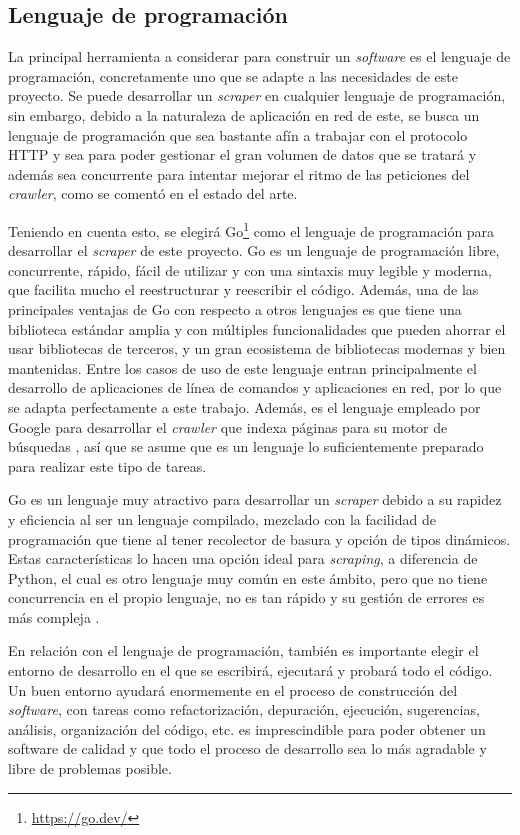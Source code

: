 \subsection{Lenguaje de programación}
La principal herramienta a considerar para construir un \textit{software} es el
lenguaje de programación, concretamente uno que se adapte a las necesidades de
este proyecto. Se puede desarrollar un \textit{scraper} en cualquier lenguaje de
programación, sin embargo, debido a la naturaleza de aplicación en red de este,
se busca un lenguaje de programación que sea bastante afín a trabajar con el
protocolo HTTP y sea para poder gestionar el gran volumen de datos que se
tratará y además sea concurrente para intentar mejorar el ritmo de las
peticiones del \textit{crawler}, como se comentó en el estado del arte.

Teniendo en cuenta esto, se elegirá Go\footnote{\url{https://go.dev/}} como el
lenguaje de programación para desarrollar el \textit{scraper} de este proyecto.
Go es un lenguaje de programación libre, concurrente, rápido, fácil de utilizar
y con una sintaxis muy legible y moderna, que facilita mucho el reestructurar y
reescribir el código. Además, una de las principales ventajas de Go con respecto
a otros lenguajes es que tiene una biblioteca estándar amplia y con múltiples
funcionalidades que pueden ahorrar el usar bibliotecas de terceros, y un gran
ecosistema de bibliotecas modernas y bien mantenidas. Entre los casos de uso de
este lenguaje entran principalmente el desarrollo de aplicaciones de línea de
comandos y aplicaciones en red, por lo que se adapta perfectamente a este
trabajo. Además, es el lenguaje empleado por Google para desarrollar el
\textit{crawler} que indexa páginas para su motor de búsquedas
\cite{go_at_google}, así que se asume que es un lenguaje lo suficientemente
preparado para realizar este tipo de tareas.

Go es un lenguaje muy atractivo para desarrollar un \textit{scraper} debido a su
rapidez y eficiencia al ser un lenguaje compilado, mezclado con la facilidad de
programación que tiene al tener recolector de basura y opción de tipos
dinámicos. Estas características lo hacen una opción ideal para
\textit{scraping}, a diferencia de Python, el cual es otro lenguaje muy común en
este ámbito, pero que no tiene concurrencia en el propio lenguaje, no es tan
rápido y su gestión de errores es más compleja \cite{coleman_ultimate_2021}.

En relación con el lenguaje de programación, también es importante elegir el
entorno de desarrollo en el que se escribirá, ejecutará y probará todo el
código. Un buen entorno ayudará enormemente en el proceso de construcción del
\textit{software}, con tareas como refactorización, depuración, ejecución,
sugerencias, análisis, organización del código, etc. es imprescindible para
poder obtener un software de calidad y que todo el proceso de desarrollo sea lo
más agradable y libre de problemas posible.

